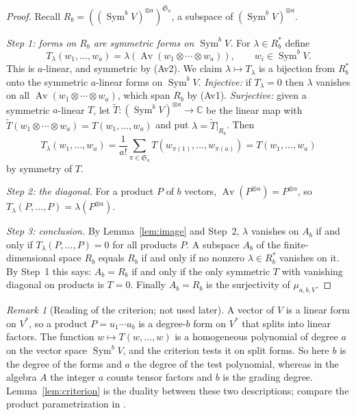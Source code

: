 \documentclass[11pt]{article}
\theoremstyle{remark}
\newtheorem{remark}[theorem]{Remark}
\DeclareMathOperator{\Sym}{Sym}
\DeclareMathOperator{\Av}{Av}
\newcommand{\C}{\mathbb C}
\newcommand{\Sa}{\mathfrak S_a}
\begin{document}
\begin{proof}
Recall $R_b=((\Sym^bV)^{\otimes a})^{\Sa}$, a subspace of
$(\Sym^bV)^{\otimes a}$.

\emph{Step 1: forms on $R_b$ are symmetric forms on $\Sym^bV$.} For
$\lambda\in R_b^*$ define
\[
 T_\lambda(w_1,\ldots,w_a)
 =\lambda\!\left(\Av(w_1\otimes\cdots\otimes w_a)\right),
 \qquad w_i\in\Sym^bV .
\]
This is $a$-linear, and symmetric by (Av2). We claim
$\lambda\mapsto T_\lambda$ is a bijection from $R_b^*$ onto the symmetric
$a$-linear forms on $\Sym^bV$.
\emph{Injective:} if $T_\lambda=0$ then $\lambda$ vanishes on all
$\Av(w_1\otimes\cdots\otimes w_a)$, which span $R_b$ by (Av1).
\emph{Surjective:} given a symmetric $a$-linear $T$, let
$\widetilde T\colon(\Sym^bV)^{\otimes a}\to\C$ be the linear map with
$\widetilde T(w_1\otimes\cdots\otimes w_a)=T(w_1,\dots,w_a)$ and put
$\lambda=\widetilde T|_{R_b}$. Then
\[
 T_\lambda(w_1,\dots,w_a)
 =\frac1{a!}\sum_{\pi\in\Sa}T(w_{\pi(1)},\dots,w_{\pi(a)})
 =T(w_1,\dots,w_a)
\]
by symmetry of $T$.

\emph{Step 2: the diagonal.} For a product $P$ of $b$ vectors,
$\Av(P^{\otimes a})=P^{\otimes a}$, so
$T_\lambda(P,\ldots,P)=\lambda(P^{\otimes a})$.

\emph{Step 3: conclusion.} By Lemma~\ref{lem:image} and Step~2, $\lambda$
vanishes on $A_b$ if and only if $T_\lambda(P,\dots,P)=0$ for all products
$P$. A subspace $A_b$ of the finite-dimensional space $R_b$ equals $R_b$ if
and only if no nonzero $\lambda\in R_b^*$ vanishes on it. By Step~1 this
says: $A_b=R_b$ if and only if the only symmetric $T$ with vanishing
diagonal on products is $T=0$. Finally $A_b=R_b$ is the surjectivity of
$\mu_{a,b,V}$.
\end{proof}

\begin{remark}[Reading of the criterion; not used later]\label{rem:reading}
A vector of $V$ is a linear form on $V^*$, so a product $P=u_1\cdots u_b$
is a degree-$b$ form on $V^*$ that splits into linear factors. The function
$w\mapsto T(w,\dots,w)$ is a homogeneous polynomial of degree $a$ on the
vector space $\Sym^bV$, and the criterion tests it on split forms. So here
$b$ is the degree of the forms and $a$ the degree of the test polynomial,
whereas in the algebra $A$ the integer $a$ counts tensor factors and $b$ is
the grading degree. Lemma~\ref{lem:criterion} is the duality between these
two descriptions; compare the product parametrization in
\cite[Section~2]{RSW}.
\end{remark}
\end{document}
